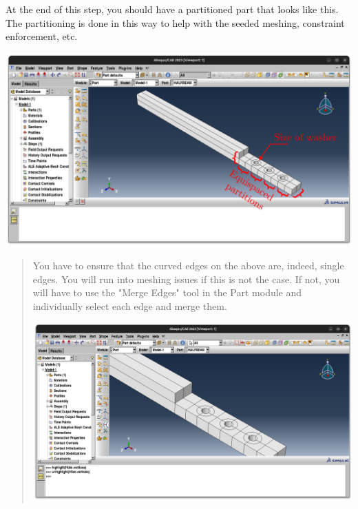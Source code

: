 \documentclass[11pt]{article}
\begin{document}
At the end of this step, you should have a partitioned part that looks like this.
The partitioning is done in this way to help with the seeded meshing, constraint enforcement, etc.
\begin{center}
\includegraphics[width=.9\linewidth]{./figs/parthb.png}
\end{center}
\begin{quote}
                              \begin{tcolorbox}[colback=osbe-bg,colframe=osbe-fg,title={IMPORTANT! Geometry Correction Note},sharp corners,boxrule=0.4pt]
You have to ensure that the curved edges on the above are, indeed, single edges. You will run into meshing issues if this is not the case.
If not, you will have to use the "Merge Edges" tool in the Part module and individually select each edge and merge them.
\begin{center}
\includegraphics[width=.9\linewidth]{./figs/medg.png}
\end{center}


               \end{tcolorbox}
\end{quote}
\end{document}
